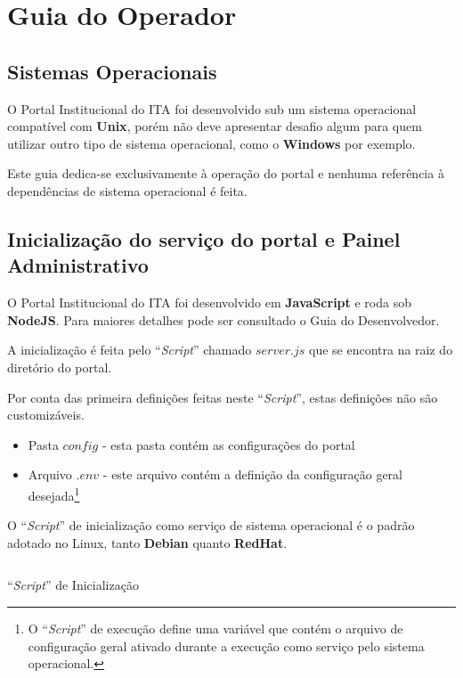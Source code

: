 \section{Guia do Operador}\label{RS0001:operator}

\subsection{Sistemas Operacionais}

O Portal Institucional do ITA foi desenvolvido sub um sistema operacional compatível com \textbf{Unix}, porém não deve apresentar desafio algum para quem utilizar outro tipo de sistema operacional, como o \textbf{Windows} por exemplo.

Este guia dedica-se exclusivamente à operação do portal e nenhuma referência à dependências de sistema operacional é feita.

\subsection{Inicialização do serviço do portal e Painel Administrativo}

O Portal Institucional do ITA foi desenvolvido em \textbf{JavaScript} e roda sob \textbf{NodeJS}. Para maiores detalhes pode ser consultado o Guia do Desenvolvedor.

A inicialização é feita pelo ``\textit{Script}'' chamado $server.js$ que se encontra na raiz do diretório do portal.

Por conta das primeira definições feitas neste ``\textit{Script}'', estas definições não são customizáveis.

\begin{itemize}
    \item Pasta $config$ - esta pasta contém as configurações do portal
    \item Arquivo $.env$ - este arquivo contém a definição da configuração geral desejada\footnote{O ``\textit{Script}'' de execução define uma variável que contém o arquivo de configuração geral ativado durante a execução como serviço pelo sistema operacional.}
\end{itemize}

O ``\textit{Script}'' de inicialização como serviço de sistema operacional é o padrão adotado no Linux, tanto \textbf{Debian} quanto \textbf{RedHat}.

\begin{code}
    \inputminted[label=portal,firstline=1,lastline=35]{Shell}{../RS0004/anexos/portal}
    \caption{``\textit{Script}'' de Inicialização}\label{RS0004:code:init}
\end{code}

